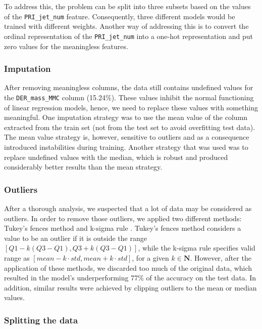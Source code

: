 \documentclass[10pt,conference,compsocconf]{IEEEtran}
\begin{document}
To address this, the problem can be split into three subsets based on the values of the \texttt{PRI\_jet\_num} feature. Consequently, three different models would be trained with different weights. Another way of addressing this is to convert the ordinal representation of the \texttt{PRI\_jet\_num} into a one-hot representation and put zero values for the meaningless features. 

\subsubsection{Imputation}

After removing meaningless columns, the data still contains undefined values for the \texttt{DER\_mass\_MMC} column (15.24\%). These values inhibit the normal functioning of linear regression models, hence, we need to replace these values with something meaningful. One imputation strategy was to use the mean value of the column extracted from the train set (not from the test set to avoid overfitting test data). The mean value strategy is, however, sensitive to outliers and as a consequence introduced instabilities during training. Another strategy that was used was to replace undefined values with the median, which is robust and produced considerably better results than the mean strategy.

\subsubsection{Outliers}
After a thorough analysis, we suspected that a lot of data may be considered as outliers. In order to remove those outliers, we applied two different methods:
Tukey's fences method \cite{tukey77} and k-sigma rule \cite{everitt2002cambridge}. Tukey's fences method considers a value to be an outlier if it is outside the range $[Q1 - k (Q3 - Q1), Q3 + k (Q3 - Q1)]$, while the k-sigma rule specifies valid range as $[mean - k \cdot std, mean + k \cdot std]$, for a given $k\in\mathbf{N}$. However, after the application of these methods, we discarded too much of the original data, which resulted in the model's underperforming 77\% of the accuracy on the test data. In addition, similar results were achieved by clipping outliers to the mean or median values.  

\subsubsection{Splitting the data}
\end{document}
